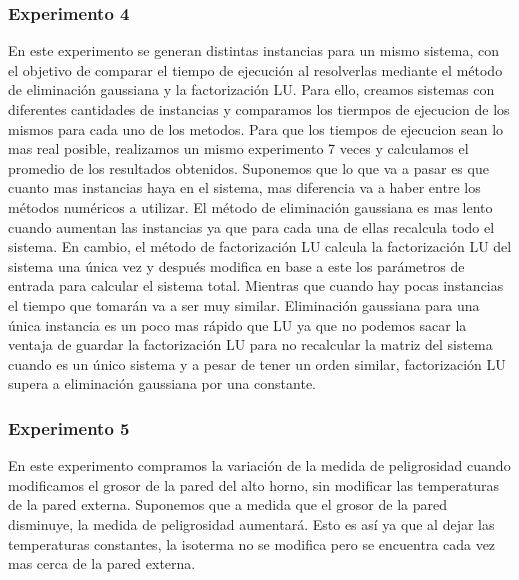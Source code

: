   	\subsubsection*{Experimento 4}
  	En este experimento se generan distintas instancias para un mismo sistema, con el objetivo de comparar el tiempo de ejecución al resolverlas mediante el método de eliminación gaussiana y la factorización LU. 
  	Para ello, creamos sistemas con diferentes cantidades de instancias y comparamos los tiermpos de ejecucion de los mismos para cada uno de los metodos.
  	Para que los tiempos de ejecucion sean lo mas real posible, realizamos un mismo experimento 7 veces y calculamos el promedio de los resultados obtenidos.
  	Suponemos que lo que va a pasar es que cuanto mas instancias haya en el sistema, mas diferencia va a haber entre los métodos numéricos a utilizar. El método de eliminación gaussiana es mas lento cuando aumentan las instancias ya que para cada una de ellas recalcula todo el sistema. En cambio, el método de factorización LU calcula la factorización LU del sistema una única vez y después modifica en base a este los parámetros de entrada para calcular el sistema total. Mientras que cuando hay pocas instancias el tiempo que tomarán va a ser muy similar. Eliminación gaussiana para una única instancia es un poco mas rápido que LU ya que no podemos sacar la ventaja de guardar la factorización LU para no recalcular la matriz del sistema cuando es un único sistema y a pesar de tener un orden similar, factorización LU supera a eliminación gaussiana por una constante.

  	\subsubsection*{Experimento 5}
  	En este experimento compramos la variación de la medida de peligrosidad cuando modificamos el grosor de la pared del alto horno, sin modificar las temperaturas de la pared externa.
	Suponemos que a medida que el grosor de la pared disminuye, la medida de peligrosidad aumentará. Esto es así ya que al dejar las temperaturas constantes, la isoterma no se modifica pero se encuentra cada vez mas cerca de la pared externa.

